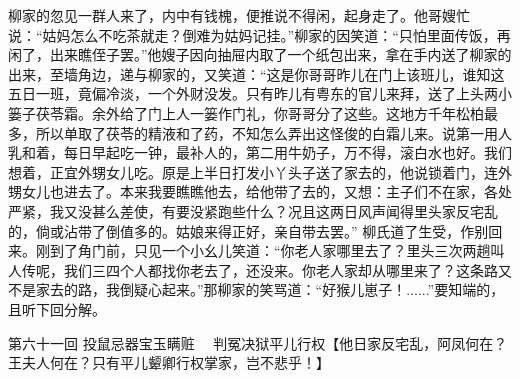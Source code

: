 \documentclass[12pt,oneside]{book}
\begin{document}
柳家的忽见一群人来了，内中有钱槐，便推说不得闲，起身走了。他哥嫂忙说：“姑妈怎么不吃茶就走？倒难为姑妈记挂。”柳家的因笑道：“只怕里面传饭，再闲了，出来瞧侄子罢。”他嫂子因向抽屉内取了一个纸包出来，拿在手内送了柳家的出来，至墙角边，递与柳家的，又笑道：“这是你哥哥昨儿在门上该班儿，谁知这五日一班，竟偏冷淡，一个外财没发。只有昨儿有粤东的官儿来拜，送了上头两小篓子茯苓霜。余外给了门上人一篓作门礼，你哥哥分了这些。这地方千年松柏最多，所以单取了茯苓的精液和了药，不知怎么弄出这怪俊的白霜儿来。说第一用人乳和着，每日早起吃一钟，最补人的，第二用牛奶子，万不得，滚白水也好。我们想着，正宜外甥女儿吃。原是上半日打发小丫头子送了家去的，他说锁着门，连外甥女儿也进去了。本来我要瞧瞧他去，给他带了去的，又想：主子们不在家，各处严紧，我又没甚么差使，有要没紧跑些什么？况且这两日风声闻得里头家反宅乱的，倘或沾带了倒值多的。姑娘来得正好，亲自带去罢。”
柳氏道了生受，作别回来。刚到了角门前，只见一个小幺儿笑道：“你老人家哪里去了？里头三次两趟叫人传呢，我们三四个人都找你老去了，还没来。你老人家却从哪里来了？这条路又不是家去的路，我倒疑心起来。”那柳家的笑骂道：“好猴儿崽子！......”要知端的，且听下回分解。





 
第六十一回  投鼠忌器宝玉瞒赃　
判冤决狱平儿行权【他日家反宅乱，阿凤何在？王夫人何在？只有平儿颦卿行权掌家，岂不悲乎！】
\end{document}
